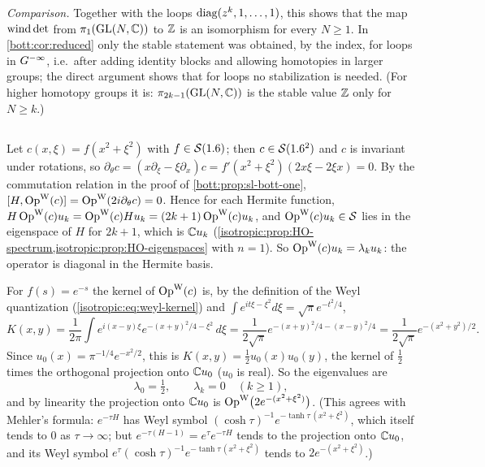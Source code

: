 \emph{Comparison.} Together with the loops $\operatorname{diag}(z^k,1,\dots,1)$, this shows
that the map
$\operatorname{wind}\det$ from $\pi_1(\operatorname{GL}(N,\mathbb{C}))$ to $\mathbb{Z}$ is an isomorphism for every $N\ge1$. In
\cref{bott:cor:reduced} only the stable statement was obtained, by the index, for loops in
$G^{-\infty}$, i.e.\ after adding identity blocks and allowing homotopies in larger groups; the direct
argument shows that for loops no stabilization is needed. (For higher homotopy groups it is:
$\pi_{2k-1}(\operatorname{GL}(N,\mathbb{C}))$ is the stable value $\mathbb{Z}$ only for $N\ge k$.)

\subsection*{}
Let $c(x,\xi)=f(x^2+\xi^2)$ with $f\in\mathcal{S}(1.6)$; then $c\in\mathcal{S}(1.6^2)$ and $c$ is invariant under
rotations, so $\partial_\theta c=(x\partial_\xi-\xi\partial_x)c=f'(x^2+\xi^2)(2x\xi-2\xi x)=0$.
By the commutation relation in the proof of \cref{bott:prop:sl-bott-one},
$[H,\operatorname{Op}^{\mathrm{W}}(c)]=\operatorname{Op}^{\mathrm{W}}(2i\partial_\theta c)=0$. Hence for each Hermite function,
$H\operatorname{Op}^{\mathrm{W}}(c)u_k=\operatorname{Op}^{\mathrm{W}}(c)Hu_k=(2k+1)\operatorname{Op}^{\mathrm{W}}(c)u_k$, and $\operatorname{Op}^{\mathrm{W}}(c)u_k\in\mathcal{S}$ lies in the eigenspace of $H$
for $2k+1$, which is $\mathbb{C} u_k$ (\cref{isotropic:prop:HO-spectrum,isotropic:prop:HO-eigenspaces}
with $n=1$). So $\operatorname{Op}^{\mathrm{W}}(c)u_k=\lambda_ku_k$: the operator is diagonal in the Hermite basis.

For $f(s)=e^{-s}$ the kernel of $\operatorname{Op}^{\mathrm{W}}(c)$ is, by the definition of the Weyl quantization
(\cref{isotropic:eq:weyl-kernel}) and $\int e^{it\xi-\xi^2}d\xi=\sqrt\pi e^{-t^2/4}$,
\begin{equation*}
  K(x,y)=\frac1{2\pi}\int e^{i(x-y)\xi}e^{-(x+y)^2/4-\xi^2}\,d\xi
  =\frac1{2\sqrt\pi}e^{-(x+y)^2/4-(x-y)^2/4}=\frac1{2\sqrt\pi}e^{-(x^2+y^2)/2}.
\end{equation*}
Since $u_0(x)=\pi^{-1/4}e^{-x^2/2}$, this is $K(x,y)=\frac12u_0(x)u_0(y)$, the kernel of
$\frac12$ times the orthogonal projection onto $\mathbb{C} u_0$ ($u_0$ is real). So the eigenvalues are
\begin{equation*}
  \lambda_0=\tfrac12,\qquad\lambda_k=0\quad(k\ge1),
\end{equation*}
and by linearity the projection onto $\mathbb{C} u_0$ is $\operatorname{Op}^{\mathrm{W}}\bigl(2e^{-(x^2+\xi^2)}\bigr)$. (This agrees with
Mehler's formula: $e^{-\tau H}$ has Weyl symbol $(\cosh\tau)^{-1}e^{-\tanh\tau\,(x^2+\xi^2)}$,
which itself tends to $0$ as $\tau\to\infty$; but $e^{-\tau(H-1)}=e^\tau e^{-\tau H}$ tends to the
projection onto $\mathbb{C} u_0$, and its Weyl symbol $e^\tau(\cosh\tau)^{-1}e^{-\tanh\tau\,(x^2+\xi^2)}$
tends to $2e^{-(x^2+\xi^2)}$.)

